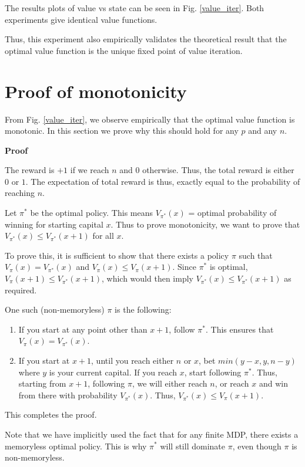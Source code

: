 \documentclass{article}
\begin{document}
The results plots of value vs state can be seen in Fig. \ref{value_iter}. Both experiments give identical value functions.

Thus, this experiment also empirically validates the theoretical result that the optimal value function is the unique fixed point of value iteration.

\section{Proof of monotonicity}

From Fig. \ref{value_iter}, we observe empirically that the optimal value function is monotonic. In this section we prove why this should hold for any $p$ and any $n$.

\textbf{Proof}

The reward is $+1$ if we reach $n$ and $0$ otherwise. Thus, the total reward is either $0$ or $1$. The expectation of total reward is thus, exactly equal to the probability of reaching $n$.


Let $\pi^*$ be the optimal policy. This means $V_{\pi^*}(x)$ = optimal probability of winning for starting capital $x$. Thus to prove monotonicity, we want to prove that $V_{\pi^*}(x) \leq V_{\pi^*}(x+1)$ for all $x$.

To prove this, it is sufficient to show that there exists a policy $\pi$ such that $V_{\pi}(x) = V_{\pi^*}(x)$ and $V_{\pi}(x) \leq V_{\pi}(x+1)$. Since $\pi^*$ is optimal, $V_{\pi}(x+1) \leq V_{\pi^*}(x+1)$, which would then imply $V_{\pi^*}(x) \leq V_{\pi^*}(x+1)$ as required.

One such (non-memoryless) $\pi$ is the following:
\begin{enumerate}
    \item If you start at any point other than $x+1$, follow $\pi^*$. This ensures that $V_{\pi}(x) = V_{\pi^*}(x)$.
    \item If you start at $x+1$, until you reach either $n$ or $x$, bet $min(y-x, y, n-y)$ where $y$ is your current capital. If you reach $x$, start following $\pi^*$. Thus, starting from $x+1$, following $\pi$, we will either reach $n$, or reach $x$ and win from there with probability $V_{\pi^*}(x)$. Thus, $V_{\pi^*}(x) \leq V_{\pi}(x+1)$.
\end{enumerate}

This completes the proof.

Note that we have implicitly used the fact that for any finite MDP, there exists a memoryless optimal policy. This is why $\pi^*$ will still dominate $\pi$, even though $\pi$ is non-memoryless.
\end{document}
